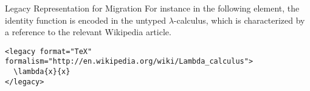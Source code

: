 \begin{omgroup}[id=mobj,short=Mathematical Objects]
\begin{module}[id=legacy]
\begin{omgroup}[id=legacy]{Legacy Representation for Migration}
For instance in the following  element, the identity function is encoded
in the untyped $\lambda$-calculus, which is characterized by a reference to the relevant
Wikipedia article.

\begin{lstlisting}[index={legacy}]
<legacy format="TeX" formalism="http://en.wikipedia.org/wiki/Lambda_calculus">
  \lambda{x}{x}
</legacy>
\end{lstlisting}
\end{omgroup}
\end{module}
\end{omgroup}

